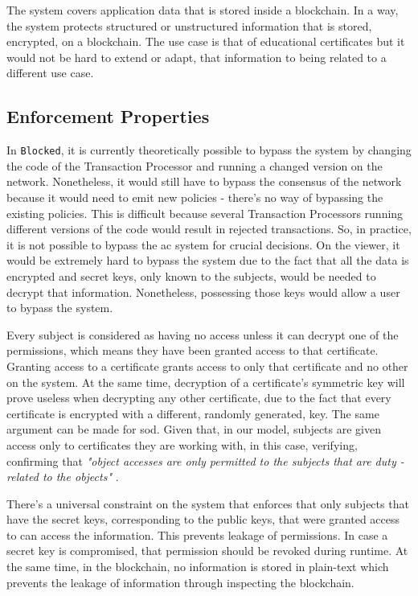 The system covers application data that is stored inside a blockchain. In a way, the system protects structured or unstructured information that is stored, encrypted, on a blockchain. The use case is that of educational certificates but it would not be hard to extend or adapt, that information to being related to a different use case.

\subsection{Enforcement Properties}

In \texttt{Blocked}, it is currently theoretically possible to bypass the system by changing the code of the Transaction Processor and running a changed version on the network. Nonetheless, it would still have to bypass the consensus of the network because it would need to emit new policies - there's no way of bypassing the existing policies. This is difficult because several Transaction Processors running different versions of the code would result in rejected transactions. So, in practice, it is not possible to bypass the \gls{ac} system for crucial decisions. On the viewer, it would be extremely hard to bypass the system due to the fact that all the data is encrypted and secret keys, only known to the subjects, would be needed to decrypt that information. Nonetheless, possessing those keys would allow a user to bypass the system.

Every subject is considered as having no access unless it can decrypt one of the permissions, which means they have been granted access to that certificate. Granting access to a certificate grants access to only that certificate and no other on the system. At the same time, decryption of a certificate's symmetric key will prove useless when decrypting any other certificate, due to the fact that every certificate is encrypted with a different, randomly generated, key. The same argument can be made for \gls{sod}. Given that, in our model, subjects are given access only to certificates they are working with, in this case, verifying, confirming that \emph{"object accesses are only permitted to the subjects that are duty
	-related to the objects"} \cite[17]{hu_guidelines_2012}.

There's a universal constraint on the system that enforces that only subjects that have the secret keys, corresponding to the public keys, that were granted access to can access the information. This prevents leakage of permissions. In case a secret key is compromised, that permission should be revoked during runtime. At the same time, in the blockchain, no information is stored in plain-text which prevents the leakage of information through inspecting the blockchain.

